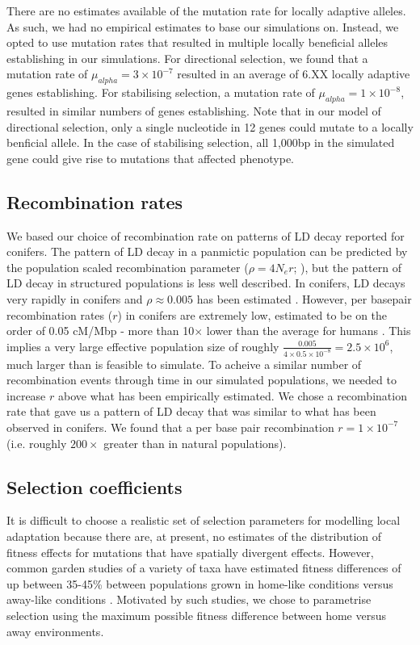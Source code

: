\documentclass[10pt,twoside,lineno]{GSA_format}
\begin{document}
There are no estimates available of the mutation rate for locally adaptive alleles. As such, we had no empirical estimates to base our simulations on. Instead, we opted to use mutation rates that resulted in multiple locally beneficial alleles establishing in our simulations. For directional selection, we found that a mutation rate of $\mu_{alpha} = 3 \times 10^{-7}$ resulted in an average of 6.XX locally adaptive genes establishing. For stabilising selection, a mutation rate of $\mu_{alpha} = 1 \times 10^{-8}$, resulted in similar numbers of genes establishing. Note that in our model of directional selection, only a single nucleotide in 12 genes could mutate to a locally benficial allele. In the case of stabilising selection, all 1,000bp in the simulated gene could give rise to mutations that affected phenotype. 


\subsection{Recombination rates}
We based our choice of recombination rate on patterns of LD decay reported for conifers. The pattern of LD decay in a panmictic population can be predicted by the population scaled recombination parameter ($\rho = 4N_er$; \citealt{RN173}), but the pattern of LD decay in structured populations is less well described. In conifers, LD decays very rapidly in conifers and $\rho \approx 0.005$ has been estimated \citep{Pavy2012}. However, per basepair recombination rates ($r$) in conifers are extremely low, estimated to be on the order of 0.05 cM/Mbp - more than 10$\times$ lower than the average for humans \citep{Stapley2017}. This implies a very large effective population size of roughly $\frac{0.005}{4\times0.5\times10^{-8}} = 2.5 \times 10^6$, much larger than is feasible to simulate. To acheive a similar number of recombination events through time in our simulated populations, we needed to increase $r$ above what has been empirically estimated. We chose a recombination rate that gave us a pattern of LD decay that was similar to what has been observed in conifers. We found that a per base pair recombination $r = 1 \times 10^{-7}$ (i.e. roughly $200\times$ greater than in natural populations).

\subsection{Selection coefficients} 

It is difficult to choose a realistic set of selection parameters for modelling local adaptation because there are, at present, no estimates of the distribution of fitness effects for mutations that have spatially divergent effects. However, common garden studies of a variety of taxa have estimated fitness differences of up between 35-45\% between populations grown in home-like conditions versus away-like conditions \citep{Hereford2009, Bontrager2020}. Motivated by such studies, we chose to parametrise selection using the maximum possible fitness difference between home versus away environments.\\
\end{document}
